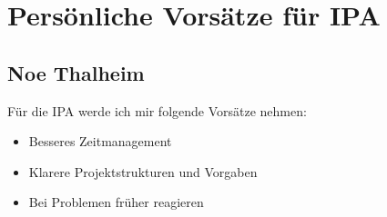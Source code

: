\section{Persönliche Vorsätze für IPA}

\subsection{Noe Thalheim}

Für die IPA werde ich mir folgende Vorsätze nehmen: \\
\begin{itemize}
    \item Besseres Zeitmanagement
    \item Klarere Projektstrukturen und Vorgaben
    \item Bei Problemen früher reagieren
\end{itemize}
